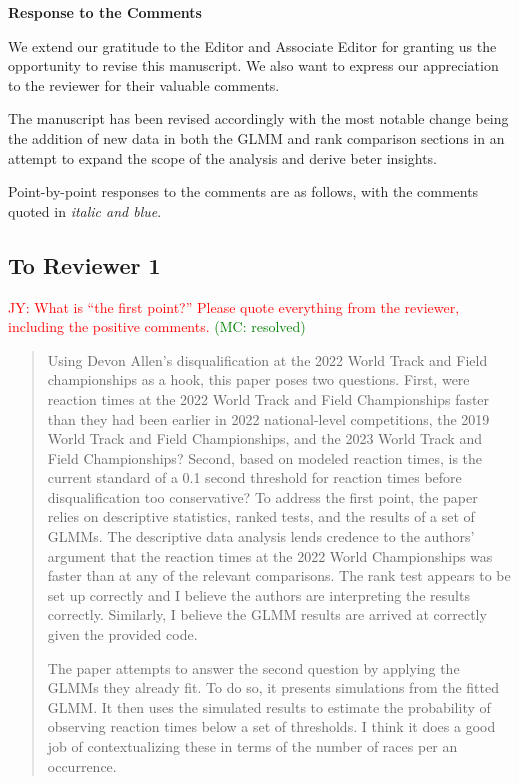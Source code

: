 \documentclass[12pt]{article}
\newcommand{\jy}[1]{\textcolor{red}{JY: #1}}
\newcommand{\of}[1]{\textcolor{green}{(MC: #1)}}
\newenvironment{comment}%
{\begin{quotation}\noindent\small\it\color{darkblue}\ignorespaces%
}{\end{quotation}}
\begin{document}
\begin{center}
  {\Large\bf Response to the Comments}
\end{center}

We extend our gratitude to the Editor and Associate Editor for 
granting us the opportunity to revise this manuscript. We also want to
express our appreciation to the reviewer for their valuable comments. 


The manuscript has been revised accordingly with the most notable change being 
the addition of new data in both the GLMM and rank comparison sections in an
attempt to expand the scope of the analysis and derive beter insights. 


Point-by-point responses to the comments are as follows, with the
comments quoted in \emph{\color{darkblue} italic and blue}.


\subsection*{To Reviewer 1}


\jy{What is ``the first point?''  Please quote everything from the
  reviewer, including the positive comments.}
\of{resolved}

\begin{comment}
Using Devon Allen's disqualification at the 2022 World Track and Field
championships as a hook, this paper poses two questions. First, were reaction
times at the 2022 World Track and Field Championships faster than they had been
earlier in 2022 national-level competitions, the 2019 World Track and Field
Championships, and the 2023 World Track and Field Championships? Second, based
on modeled reaction times, is the current standard of a 0.1 second threshold
for reaction times before disqualification too conservative? To
address the first point, the paper relies on descriptive statistics, ranked
tests, and the results of a set of GLMMs. The descriptive data analysis lends
credence to the authors' argument that the reaction times at the 2022 World
Championships was faster than at any of the relevant comparisons. The rank test
appears to be set up correctly and I believe the authors are interpreting the
results correctly. Similarly, I believe the GLMM results are arrived at
correctly given the provided code.

The paper attempts to answer the second question by applying the GLMMs they
already fit. To do so, it presents simulations from the fitted GLMM. It then
uses the simulated results to estimate the probability of observing reaction
times below a set of thresholds. I think it does a good job of contextualizing
these in terms of the number of races per an occurrence.
\end{comment}
\end{document}
